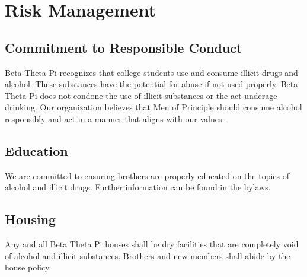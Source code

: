 \chapter{Risk Management}
\label{cha:risk-management}

\section{Commitment to Responsible Conduct}
\label{sec:commitment-to-responsible-conduct}

Beta Theta Pi recognizes that college students use and consume illicit drugs and
alcohol.
These substances have the potential for abuse if not used properly.
Beta Theta Pi does not condone the use of illicit substances or the act underage
drinking.
Our organization believes that Men of Principle should consume alcohol
responsibly and act in a manner that aligns with our values.

\section{Education}
\label{sec:education}

We are committed to ensuring brothers are properly educated on the topics of
alcohol and illicit drugs.
Further information can be found in the bylaws.

\section{Housing}
\label{sec:housing}

Any and all Beta Theta Pi houses shall be dry facilities that are completely
void of alcohol and illicit substances.
Brothers and new members shall abide by the house policy.
